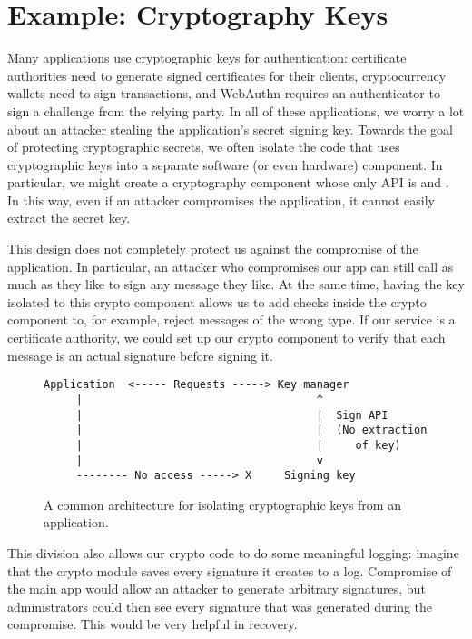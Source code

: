 \section{Example: Cryptography Keys}
Many applications use cryptographic keys for authentication: certificate authorities need to generate signed certificates for their clients, cryptocurrency wallets need to sign transactions, and WebAuthn requires an authenticator to sign a challenge from the relying party. 
In all of these applications, we worry a lot about an attacker stealing the application's secret signing key.
Towards the goal of protecting cryptographic secrets, we often
isolate the code that uses cryptographic keys into a separate software (or even hardware)
component.
In particular, we might create a cryptography component whose 
only API is  and .
In this way, even if an attacker compromises the application, it cannot
easily extract the secret key.

This design does not completely protect us against the compromise of the application.
In particular, an attacker who compromises our app can still call  as much as they like to sign any message they like. 
At the same time, having the key isolated to this crypto component allows us to add checks inside the crypto component to, for example, reject messages of the wrong type. If our service is a certificate authority, we could set up our crypto component to verify that each message is an actual signature before signing it.

\begin{figure}
\begin{verbatim}
Application  <----- Requests -----> Key manager
     |                                    ^
     |                                    |  Sign API
     |                                    |  (No extraction 
     |                                    |     of key)
     |                                    v
     -------- No access -----> X     Signing key
\end{verbatim}
\caption{A common architecture for isolating cryptographic
keys from an application.}
\end{figure}
This division also allows our crypto code to do some meaningful logging: imagine that the crypto module saves every signature it creates to a log. Compromise of the main app would allow an attacker to generate arbitrary signatures, but administrators could then see every signature that was generated during the compromise. This would be very helpful in recovery.

